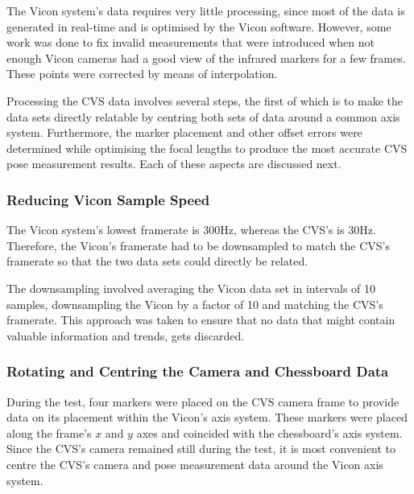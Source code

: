 The Vicon system's data requires very little processing, since most of the data is generated in real-time and is optimised by the Vicon software. However, some work was done to fix invalid measurements that were introduced when not enough Vicon cameras had a good view of the infrared markers for a few frames. These points were corrected by means of interpolation. %

Processing the CVS data involves several steps, the first of which is to make the data sets directly relatable by centring  both sets of data around a common axis system. Furthermore, the marker placement and other offset errors were determined while optimising the focal lengths to produce the most accurate CVS pose measurement results. Each of these aspects are discussed next.

\subsubsection{Reducing Vicon Sample Speed}

The Vicon system's lowest framerate is 300Hz, whereas the CVS's is 30Hz. Therefore, the Vicon's framerate had to be downsampled to match the CVS's framerate so that the two data sets could directly be related. 

The downsampling involved averaging the Vicon data set in intervals of 10 samples, downsampling the Vicon by a factor of 10 and matching the CVS's framerate. This approach was taken to ensure that no data that might contain valuable information and trends, gets discarded. 

\subsubsection{Rotating and Centring the Camera and Chessboard Data}
\label{sec:rotate-axes}

During the test, four markers were placed on the CVS camera frame to provide data on its placement within the Vicon's axis system. These markers were placed along the frame's $x$ and $y$ axes and coincided with the chessboard's axis system. Since the CVS's camera remained still during the test, it is most convenient to centre the CVS's camera and pose measurement data around the Vicon axis system. 

